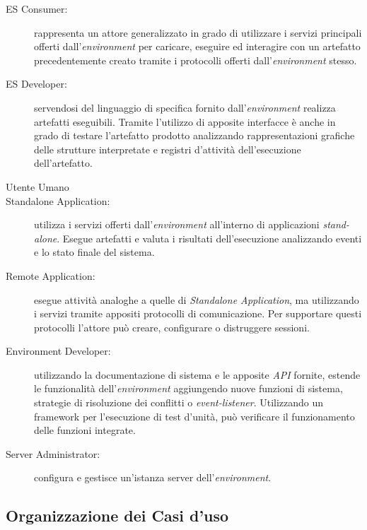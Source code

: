 \begin{description}
	\item[ES Consumer:] rappresenta un attore generalizzato in grado di utilizzare i servizi principali offerti dall'\emph{environment} per caricare, eseguire ed interagire con un artefatto precedentemente creato tramite i protocolli offerti dall'\emph{environment} stesso.
	
	\item[ES Developer:] servendosi del linguaggio di specifica fornito dall'\emph{environment} realizza artefatti eseguibili. Tramite l'utilizzo di apposite interfacce è anche in grado di testare l'artefatto prodotto analizzando rappresentazioni grafiche delle strutture interpretate e registri d'attività dell'esecuzione dell'artefatto.
	\item[Utente Umano]
	
	\item[Standalone Application:] utilizza i servizi offerti dall'\emph{environment} all'interno di applicazioni \emph{stand-alone}. Esegue artefatti e valuta i risultati dell'esecuzione analizzando eventi e lo stato finale del sistema.
	
	\item[Remote Application:] esegue attività analoghe a quelle di \emph{Standalone Application}, ma utilizzando i servizi tramite appositi protocolli di comunicazione. Per supportare questi protocolli l'attore può creare, configurare o distruggere sessioni.
	
	\item[Environment Developer:] utilizzando la documentazione di sistema e le apposite \emph{API} fornite, estende le funzionalità dell'\emph{environment} aggiungendo nuove funzioni di sistema, strategie di risoluzione dei conflitti o \emph{event-listener}. Utilizzando un framework per l'esecuzione di test d'unità, può verificare il funzionamento delle funzioni integrate.
	
	\item[Server Administrator:] configura e gestisce un'istanza server dell'\emph{en\-vi\-ron\-ment}.
	
\end{description}

\subsection{Organizzazione dei Casi d'uso}

